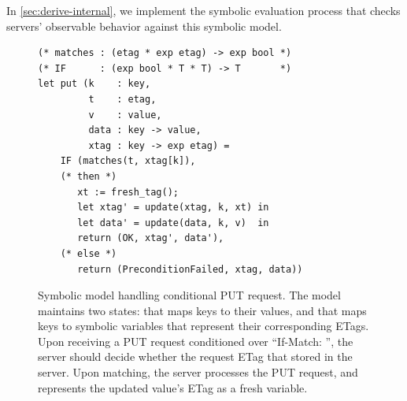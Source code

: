In \autoref{sec:derive-internal}, we implement the symbolic evaluation process
that checks servers' observable behavior against this symbolic model.

\begin{figure}
\begin{lstlisting}[style=customcoq]
(* matches : (etag * exp etag) -> exp bool *)
(* IF      : (exp bool * T * T) -> T       *)
let put (k    : key,
         t    : etag,
         v    : value,
         data : key -> value,
         xtag : key -> exp etag) =
    IF (matches(t, xtag[k]),
    (* then *)
       xt := fresh_tag();
       let xtag' = update(xtag, k, xt) in
       let data' = update(data, k, v)  in
       return (OK, xtag', data'),
    (* else *)
       return (PreconditionFailed, xtag, data))
\end{lstlisting}
\caption{Symbolic model handling conditional PUT request.  The model maintains
  two states:  that maps keys to their values, and  that
  maps keys to symbolic variables that represent their corresponding ETags.
  Upon receiving a PUT request conditioned over ``If-Match: '', the
  server should decide whether the request ETag  that stored in the
  server.  Upon matching, the server processes the PUT request, and represents
  the updated value's ETag as a fresh variable.
}
\label{fig:if-match-model}
\end{figure}

